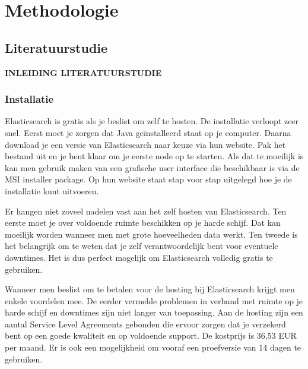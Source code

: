 
\chapter{Methodologie}
\label{ch:methodologie}


\section{Literatuurstudie}

\textbf{INLEIDING LITERATUURSTUDIE}

\subsection{Installatie}
\label{Installatie}

Elasticsearch is gratis als je beslist om zelf te hosten. De installatie verloopt zeer snel. Eerst moet je zorgen dat Java geïnstalleerd staat op je computer. Daarna download je een versie van Elasticsearch naar keuze via hun website. Pak het bestand uit en je bent klaar om je eerste node op te starten. Als dat te moeilijk is kan men gebruik maken van een grafische user interface die beschikbaar is via de MSI installer package. Op hun website staat stap voor stap uitgelegd hoe je de installatie kunt uitvoeren. 

Er hangen niet zoveel nadelen vast aan het zelf hosten van Elasticsearch. Ten eerste moet je over voldoende ruimte beschikken op je harde schijf. Dat kan moeilijk worden wanneer men met grote hoeveelheden data werkt. Ten tweede is het belangrijk om te weten dat je zelf verantwoordelijk bent voor eventuele downtimes. Het is dus perfect mogelijk om Elasticsearch volledig gratis te gebruiken. 

Wanneer men beslist om te betalen voor de hosting bij Elasticsearch krijgt men enkele voordelen mee. De eerder vermelde problemen in verband met ruimte op je harde schijf en downtimes zijn niet langer van toepassing.  Aan de hosting zijn een aantal Service Level Agreements gebonden die ervoor zorgen dat je verzekerd bent op een goede kwaliteit en op voldoende support. De kostprijs is 36,53 EUR per maand. Er is ook een mogelijkheid om vooraf een proefversie van 14 dagen te gebruiken.

